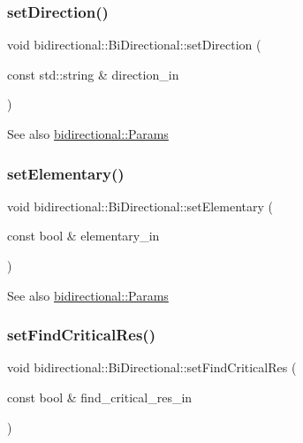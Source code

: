 \subsubsection{\texorpdfstring{set\+Direction()}{setDirection()}}
{\footnotesize\ttfamily void bidirectional\+::\+Bi\+Directional\+::set\+Direction (\begin{DoxyParamCaption}\item[{const std\+::string \&}]{direction\+\_\+in }\end{DoxyParamCaption})\hspace{0.3cm}{\ttfamily [inline]}}

\begin{DoxySeeAlso}{See also}
\hyperlink{classbidirectional_1_1Params}{bidirectional\+::\+Params} 
\end{DoxySeeAlso}
\mbox{\label{classbidirectional_1_1BiDirectional_aafbbf3fb26308432be606799903f430e}} 
\subsubsection{\texorpdfstring{set\+Elementary()}{setElementary()}}
{\footnotesize\ttfamily void bidirectional\+::\+Bi\+Directional\+::set\+Elementary (\begin{DoxyParamCaption}\item[{const bool \&}]{elementary\+\_\+in }\end{DoxyParamCaption})\hspace{0.3cm}{\ttfamily [inline]}}

\begin{DoxySeeAlso}{See also}
\hyperlink{classbidirectional_1_1Params}{bidirectional\+::\+Params} 
\end{DoxySeeAlso}
\mbox{\label{classbidirectional_1_1BiDirectional_ad309aa627316fbccdf1d6e747d064c05}} 
\subsubsection{\texorpdfstring{set\+Find\+Critical\+Res()}{setFindCriticalRes()}}
{\footnotesize\ttfamily void bidirectional\+::\+Bi\+Directional\+::set\+Find\+Critical\+Res (\begin{DoxyParamCaption}\item[{const bool \&}]{find\+\_\+critical\+\_\+res\+\_\+in }\end{DoxyParamCaption})\hspace{0.3cm}{\ttfamily [inline]}}

